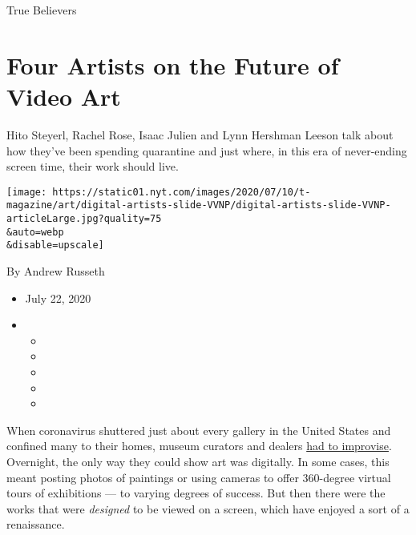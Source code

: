 True Believers

\hypertarget{four-artists-on-the-future-of-video-art}{%
\section{Four Artists on the Future of Video
Art}\label{four-artists-on-the-future-of-video-art}}

Hito Steyerl, Rachel Rose, Isaac Julien and Lynn Hershman Leeson talk
about how they've been spending quarantine and just where, in this era
of never-ending screen time, their work should live.

\texttt{[image: https://static01.nyt.com/images/2020/07/10/t-magazine/art/digital-artists-slide-VVNP/digital-artists-slide-VVNP-articleLarge.jpg?quality=75\\\&auto=webp\\\&disable=upscale]}

By Andrew Russeth

\begin{itemize}
\item
  July 22, 2020
\item
  \begin{itemize}
  \item
  \item
  \item
  \item
  \item
  \end{itemize}
\end{itemize}

When coronavirus shuttered just about every gallery in the United States
and confined many to their homes, museum curators and dealers
\href{https://www.nytimes.com/2020/03/16/arts/design/art-galleries-online-viewing-coronavirus.html}{had
to improvise}. Overnight, the only way they could show art was
digitally. In some cases, this meant posting photos of paintings or
using cameras to offer 360-degree virtual tours of exhibitions --- to
varying degrees of success. But then there were the works that were
\emph{designed} to be viewed on a screen, which have enjoyed a sort of a
renaissance.

